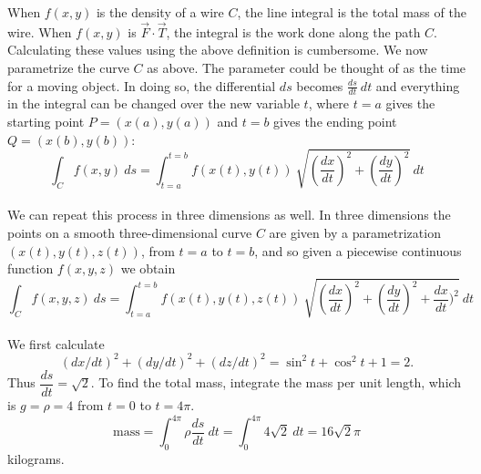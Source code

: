 When $f(x,y)$ is the density of a wire $C$, the line integral is the total mass of the wire. When $f(x,y)$ is $\vec F \cdot \vec T$, the integral is the work done along the path $C$. Calculating these values using the above definition is cumbersome. We now parametrize the curve $C$ as above.  The parameter could be thought of as the time for a moving object.  In doing so, the differential $ds$ becomes $\frac{ds}{dt} \: dt$ and everything in the integral can be changed over the new variable $t$, where $t = a$ gives the starting point $P = (x(a),y(a))$ and $t = b$ gives the ending point $Q = (x(b),y(b))$:
$$\int_C f(x,y) \: ds = \int_{t=a}^{t=b} f(x(t),y(t)) \: \sqrt{(\dfrac{dx}{dt})^2+(\dfrac{dy}{dt})^2} \: dt$$\\

We can repeat this process in three dimensions as well. In three dimensions the points on a smooth three-dimensional curve $C$ are given by a parametrization $(x(t), y(t), z(t))$, from $t = a$ to $t = b$, and so given a piecewise continuous function $f(x,y,z)$ we obtain
$$\int_C f(x,y,z) \: ds = \int_{t=a}^{t=b} f(x(t),y(t),z(t)) \: \sqrt{(\dfrac{dx}{dt})^2+(\dfrac{dy}{dt})^2 + \dfrac{dx}{dt})^2} \: dt$$\\


{We first calculate 
$$(dx/dt)^2 + (dy/dt)^2 + (dz/dt)^2 = \sin^2 t + \cos^2 t + 1 = 2.$$ Thus
$\dfrac{ds}{dt} = \sqrt{2}$. To find the total mass, integrate the mass per unit length, which is $g = \rho = 4$ from $t = 0$ to $t = 4\pi$.
$$\text{mass}=\int_0^{4\pi} \rho \dfrac{ds}{dt} \: dt = \int_0^{4\pi}4\sqrt{2}\: dt = 16\sqrt{2}\pi$$
kilograms.}\\

\\




